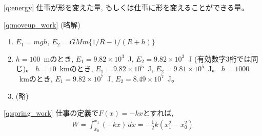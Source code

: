 % 
\ref{q:energy}
仕事が形を変えた量, もしくは仕事に形を変えることができる量。
\vspace{0.2cm}

\ref{q:moveup_work} (略解)
\begin{enumerate}
\item $E_1=mgh$, $E_2=GMm\{1/R-1/(R+h)\}$
\item $h=100$~mのとき, $E_1=9.82\times 10^{3}$~J, $E_2=9.82\times 10^{3}$~J (有効数字3桁では同じ)。
$h=10$~kmのとき, $E_1=9.82\times 10^{5}$~J, $E_2=9.81\times 10^{5}$~J。
$h=1000$~kmのとき, $E_1=9.82\times 10^{7}$~J, $E_2=8.49\times 10^{7}$~J。
\item (略)
\end{enumerate}
\vspace{0.2cm}

% 
\ref{q:spring_work}
仕事の定義で$F(x)=-kx$とすれば, 
\begin{eqnarray}W=\int_{x_0}^{x_1}(-kx)\,dx=-\frac{1}{2}k(x_1^2-x_0^2)\end{eqnarray}
\vspace{0.2cm}

